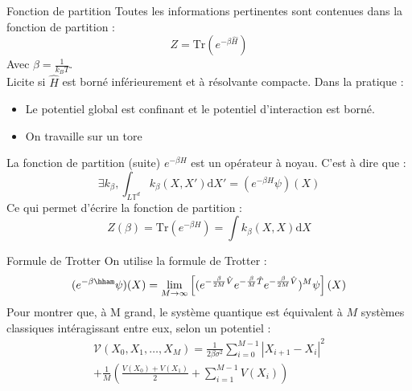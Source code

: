 \documentclass{beamer}
\begin{document}
\begin{frame}{Fonction de partition}
    Toutes les informations pertinentes sont contenues dans la fonction de partition :
    \begin{equation}
        Z=\mathrm{Tr}(e^{-\beta \hat{H}})
    \end{equation}
    Avec $\beta=\frac{1}{k_B T}$.
    \\
    
    Licite si $\hat{H}$ est borné inférieurement et à résolvante compacte. Dans la pratique :
    \begin{itemize}
        \item Le potentiel global est confinant et le potentiel d'interaction est borné.
        \item On travaille sur un tore
    \end{itemize}
\end{frame}

\begin{frame}{La fonction de partition (suite)}
    $e^{-\beta H}$ est un opérateur à noyau. C'est à dire que : 
    \begin{equation}
        \exists k_\beta, \int_{L\mathbb{T}^d}k_\beta(X,X')\mathrm{d}X'=(e^{-\beta H}\psi)(X)
    \end{equation}
    Ce qui permet d'écrire la fonction de partition :
    \begin{equation}
        Z(\beta)=\mathrm{Tr}\left(e^{-\beta H}\right)=\int k_\beta(X,X)\mathrm{d}X
    \end{equation}
\end{frame}

\begin{frame}{Formule de Trotter}
    On utilise la formule de Trotter :
    \begin{equation}
        (e^{-\beta \hham}\psi)(X)=\lim_{M\to \infty}\left[(e^{-\frac{\beta}{2M}\hat{V}}e^{-\frac{\beta}{M}\hat{T}}e^{-\frac{\beta}{2M}\hat{V}})^M\psi\right](X)
    \end{equation}
    Pour montrer que, à M grand, le système quantique est équivalent à $M$ systèmes classiques intéragissant entre eux, selon un potentiel :
    \begin{multline}
        \mathcal{V}\left(X_0,X_1,\ldots,X_M\right)= \frac{1}{2\beta\sigma^2}\sum_{i=0}^{M-1}|X_{i+1}-X_i|^2\\+\frac{1}{M}\left(\frac{V(X_0)+V(X_1)}{2}+\sum_{i=1}^{M-1} V(X_i)\right)
    \end{multline}
\end{frame}
\end{document}
